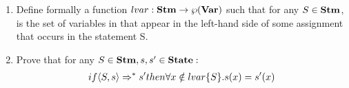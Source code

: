 \newcommand{\lvar}[1]{\textrm{\normalfont{\texttt{lvar(#1)}}}}
\newcommand{\exTwo}{$if~\confSs{S}{s}\Rar{*}s'~then~\forall{} x \notin lvar\{S\}.s(x)=s'(x)$}
\newcommand{\exTwoM}[1]{$if~\confSs{#1}{s}\Rar{*}s'~then~\forall{} x \notin lvar\{#1\}.s(x)=s'(x)$}
\newcommand{\exTwoMM}[3]{$if~\confSs{#1}{#2}\Rar{*}#3~then~\forall{} x \notin lvar\{#1\}.#2(x)=#3(x)$}

{
	\begin{enumerate}
	\item Define formally a function $lvar:\mbox{\textbf{Stm}}\rightarrow\wp(\mbox{\textbf{Var}})$ such that
	for any $S\in\mbox{\textbf{Stm}}$, \lvar{S} is the set of variables in \var{} that appear
	in the left-hand side of some assignment that occurs in the statement S.
	\item Prove that for any $S\in\mbox{\textbf{Stm}}, s,s'\in\mbox{\textbf{State}}:$ \\
	\begin{align*}
	if \langle{}S, s\rangle{}\Rightarrow^{*}s' then \forall{} x \notin lvar\{S\}.s(x)=s'(x)
	\end{align*}
	\end{enumerate}
}
